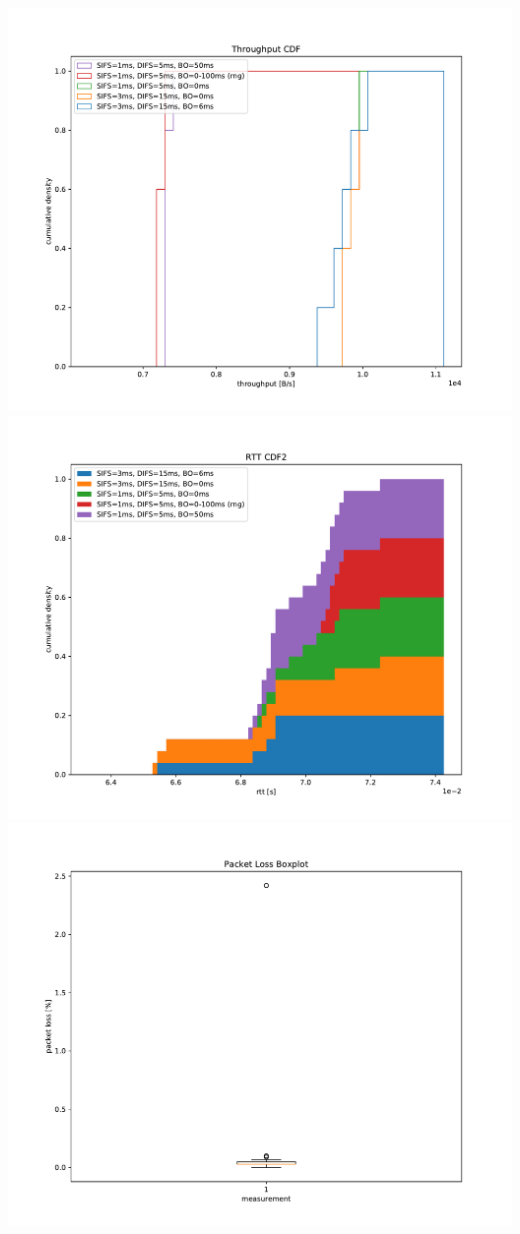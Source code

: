 \documentclass{article}
\begin{document}
	\includegraphics[width=\textwidth]{cdf/throughput_cdf}
	\includegraphics[width=\textwidth]{cdf2/rtt_cdf2}
	\includegraphics[width=\textwidth]{boxplot/packet_loss_boxplot}
\end{document}
